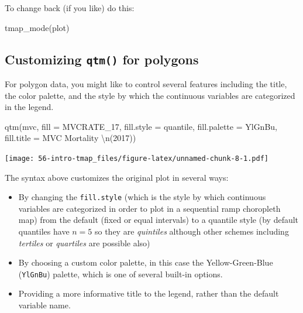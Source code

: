 \documentclass[
]{book}
\newenvironment{Shaded}{\begin{snugshade}}{\end{snugshade}}
\newcommand{\AttributeTok}[1]{\textcolor[rgb]{0.77,0.63,0.00}{#1}}
\newcommand{\FunctionTok}[1]{\textcolor[rgb]{0.00,0.00,0.00}{#1}}
\newcommand{\NormalTok}[1]{#1}
\newcommand{\SpecialCharTok}[1]{\textcolor[rgb]{0.00,0.00,0.00}{#1}}
\newcommand{\StringTok}[1]{\textcolor[rgb]{0.31,0.60,0.02}{#1}}
\providecommand{\tightlist}{%
  \setlength{\itemsep}{0pt}\setlength{\parskip}{0pt}}
\begin{document}
To change back (if you like) do this:

\begin{Shaded}
\begin{Highlighting}[]
\FunctionTok{tmap\_mode}\NormalTok{(}\StringTok{\textquotesingle{}plot\textquotesingle{}}\NormalTok{)}
\end{Highlighting}
\end{Shaded}

\hypertarget{customizing-qtm-for-polygons}{%
\subsection{\texorpdfstring{Customizing \texttt{qtm()} for polygons}{Customizing qtm() for polygons}}\label{customizing-qtm-for-polygons}}

For polygon data, you might like to control several features including the title, the color palette, and the style by which the continuous variables are categorized in the legend.

\begin{Shaded}
\begin{Highlighting}[]
\FunctionTok{qtm}\NormalTok{(mvc,}
    \AttributeTok{fill =} \StringTok{\textquotesingle{}MVCRATE\_17\textquotesingle{}}\NormalTok{, }
    \AttributeTok{fill.style =} \StringTok{\textquotesingle{}quantile\textquotesingle{}}\NormalTok{, }
    \AttributeTok{fill.palette =} \StringTok{\textquotesingle{}YlGnBu\textquotesingle{}}\NormalTok{,}
    \AttributeTok{fill.title =} \StringTok{\textquotesingle{}MVC Mortality }\SpecialCharTok{\textbackslash{}n}\StringTok{(2017)\textquotesingle{}}\NormalTok{)}
\end{Highlighting}
\end{Shaded}

\texttt{[image: 56-intro-tmap\_files/figure-latex/unnamed-chunk-8-1.pdf]}

The syntax above customizes the original plot in several ways:

\begin{itemize}
\tightlist
\item
  By changing the \texttt{fill.style} (which is the style by which continuous variables are categorized in order to plot in a sequential ramp choropleth map) from the default (fixed or equal intervals) to a quantile style (by default quantiles have \(n=5\) so they are \emph{quintiles} although other schemes including \emph{tertiles} or \emph{quartiles} are possible also)
\item
  By choosing a custom color palette, in this case the Yellow-Green-Blue (\texttt{YlGnBu}) palette, which is one of several built-in options.
\item
  Providing a more informative title to the legend, rather than the default variable name.
\end{itemize}
\end{document}
